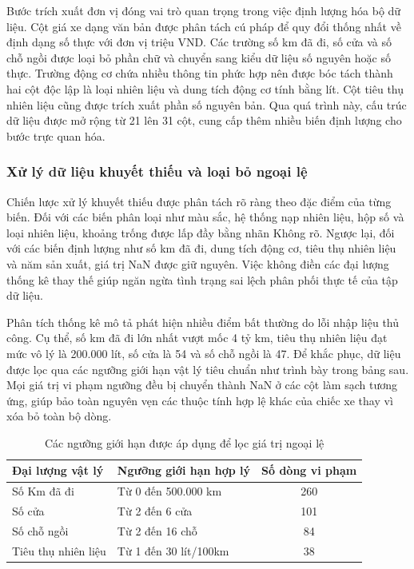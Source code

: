 Bước trích xuất đơn vị đóng vai trò quan trọng trong việc định lượng hóa bộ dữ liệu. Cột giá xe dạng văn bản được phân tách cú pháp để quy đổi thống nhất về định dạng số thực với đơn vị triệu VND. Các trường số km đã đi, số cửa và số chỗ ngồi được loại bỏ phần chữ và chuyển sang kiểu dữ liệu số nguyên hoặc số thực. Trường động cơ chứa nhiều thông tin phức hợp nên được bóc tách thành hai cột độc lập là loại nhiên liệu và dung tích động cơ tính bằng lít. Cột tiêu thụ nhiên liệu cũng được trích xuất phần số nguyên bản. Qua quá trình này, cấu trúc dữ liệu được mở rộng từ 21 lên 31 cột, cung cấp thêm nhiều biến định lượng cho bước trực quan hóa.

\subsubsection{Xử lý dữ liệu khuyết thiếu và loại bỏ ngoại lệ}
Chiến lược xử lý khuyết thiếu được phân tách rõ ràng theo đặc điểm của từng biến. Đối với các biến phân loại như màu sắc, hệ thống nạp nhiên liệu, hộp số và loại nhiên liệu, khoảng trống được lấp đầy bằng nhãn Không rõ. Ngược lại, đối với các biến định lượng như số km đã đi, dung tích động cơ, tiêu thụ nhiên liệu và năm sản xuất, giá trị NaN được giữ nguyên. Việc không điền các đại lượng thống kê thay thế giúp ngăn ngừa tình trạng sai lệch phân phối thực tế của tập dữ liệu.

Phân tích thống kê mô tả phát hiện nhiều điểm bất thường do lỗi nhập liệu thủ công. Cụ thể, số km đã đi lớn nhất vượt mốc 4 tỷ km, tiêu thụ nhiên liệu đạt mức vô lý là 200.000 lít, số cửa là 54 và số chỗ ngồi là 47. Để khắc phục, dữ liệu được lọc qua các ngưỡng giới hạn vật lý tiêu chuẩn như trình bày trong bảng sau. Mọi giá trị vi phạm ngưỡng đều bị chuyển thành NaN ở các cột làm sạch tương ứng, giúp bảo toàn nguyên vẹn các thuộc tính hợp lệ khác của chiếc xe thay vì xóa bỏ toàn bộ dòng.

\begin{table}[htpb]
\centering
\caption{Các ngưỡng giới hạn được áp dụng để lọc giá trị ngoại lệ}
\begin{tabular}{l l c}
\textbf{Đại lượng vật lý} & \textbf{Ngưỡng giới hạn hợp lý} & \textbf{Số dòng vi phạm} \\ \hline
Số Km đã đi & Từ 0 đến 500.000 km & 260 \\
Số cửa & Từ 2 đến 6 cửa & 101 \\
Số chỗ ngồi & Từ 2 đến 16 chỗ & 84 \\
Tiêu thụ nhiên liệu & Từ 1 đến 30 lít/100km & 38 \\
\end{tabular}
\end{table}


